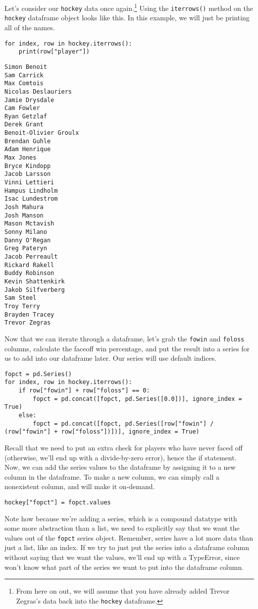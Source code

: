 Let's consider our \verb|hockey| data once again.\cprotect\footnote{From here on out, we will assume that you have already added Trevor Zegras's data back into the \verb|hockey| dataframe.} Using the \verb|iterrows()| method on the \verb|hockey| dataframe object looks like this. In this example, we will just be printing all of the names.\par
\begin{lstlisting}[style=pippython]
for index, row in hockey.iterrows():
	print(row["player"])
\end{lstlisting}
\begin{lstlisting}[style=none]
Simon Benoit
Sam Carrick
Max Comtois
Nicolas Deslauriers
Jamie Drysdale
Cam Fowler
Ryan Getzlaf
Derek Grant
Benoit-Olivier Groulx
Brendan Guhle
Adam Henrique
Max Jones
Bryce Kindopp
Jacob Larsson
Vinni Lettieri
Hampus Lindholm
Isac Lundestrom
Josh Mahura
Josh Manson
Mason Mctavish
Sonny Milano
Danny O'Regan
Greg Pateryn
Jacob Perreault
Rickard Rakell
Buddy Robinson
Kevin Shattenkirk
Jakob Silfverberg
Sam Steel
Troy Terry
Brayden Tracey
Trevor Zegras
\end{lstlisting}
Now that we can iterate through a dataframe, let's grab the \verb|fowin| and \verb|foloss| columns, calculate the faceoff win percentage, and put the result into a  series for us to add into our dataframe later. Our series will use default indices.\par
\begin{lstlisting}[style=pippython]
fopct = pd.Series()
for index, row in hockey.iterrows():
	if row["fowin"] + row["foloss"] == 0:
		fopct = pd.concat([fopct, pd.Series([0.0])], ignore_index = True)
	else:
		fopct = pd.concat([fopct, pd.Series([row["fowin"] / (row["fowin"] + row["foloss"])])], ignore_index = True)
\end{lstlisting}
Recall that we need to put an extra check for players who have never faced off (otherwise, we'll end up with a divide-by-zero error), hence the if statement. Now, we can add the series values to the dataframe by assigning it to a new column in the dataframe. To make a new column, we can simply call a nonexistent column, and  will make it on-demand.\par
\begin{lstlisting}[style=pippython]
hockey["fopct"] = fopct.values
\end{lstlisting}
Note how because we're adding a series, which is a compound datatype with some more abstraction than a list, we need to explicitly say that we want the values out of the \verb|fopct| series object. Remember, series have a lot more data than just a list, like an index. If we try to just put the series into a dataframe column without saying that we want the values, we'll end up with a TypeError, since  won't know what part of the series we want to put into the dataframe column.\par
